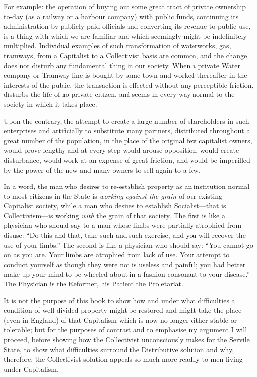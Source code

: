 \documentclass{book}
\begin{document}
For example: the operation of buying out some great tract of private ownership to-day (as a railway or a harbour company) with public funds, continuing its administration by publicly paid officials and converting its revenue to public use, is a thing with which we are familiar and which seemingly might be indefinitely multiplied. Individual examples of such transformation of waterworks, gas, tramways, from a Capitalist to a Collectivist basis are common, and the change does not disturb any fundamental thing in our society. When a private Water company or Tramway line is bought by some town and worked thereafter in the interests of the public, the transaction is effected without any perceptible friction, disturbs the life of no private citizen, and seems in every way normal to the society in which it takes place.

Upon the contrary, the attempt to create a large number of shareholders in such enterprises and artificially to substitute many partners, distributed throughout a great number of the population, in the place of the original few capitalist owners, would prove lengthy and at every step would arouse opposition, would create disturbance, would work at an expense of great friction, and would be imperilled by the power of the new and many owners to sell again to a few.

In a word, the man who desires to re-establish property as an institution normal to most citizens in the State is \emph{working against the grain} of our existing Capitalist society, while a man who desires to establish Socialist—that is Collectivism—is working \emph{with} the grain of that society. The first is like a physician who should say to a man whose limbs were partially atrophied from disuse: “Do this and that, take such and such exercise, and you will recover the use of your limbs.” The second is like a physician who should say: “You cannot go on as you are. Your limbs are atrophied from lack of use. Your attempt to conduct yourself as though they were not is useless and painful; you had better make up your mind to be wheeled about in a fashion consonant to your disease.” The Physician is the Reformer, his Patient the Proletariat.

It is not the purpose of this book to show how and under what difficulties a condition of well-divided property might be restored and might take the place (even in England) of that Capitalism which is now no longer either stable or tolerable; but for the purposes of contrast and to emphasise my argument I will proceed, before showing how the Collectivist unconsciously makes for the Servile State, to show what difficulties surround the Distributive solution and why, therefore, the Collectivist solution appeals so much more readily to men living under Capitalism.
\end{document}

